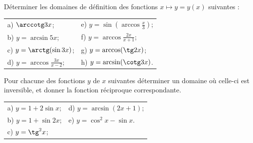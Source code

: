 \documentclass[12pt,french,oneside,a4paper]{memoir} %
\begin{document}
\begin{exo}
Déterminer les domaines de définition des fonctions
  $x\mapsto y=y(x)$ suivantes :
  
  \begin{tabular}{ll}
  a) $\displaystyle{\arccotg 3x}$;\qquad\qquad&
  e) $\displaystyle{y=\sin(\arccos\frac{x}{3})}$;\\[2mm]
  b) $\displaystyle{y=\arcsin 5x}$;\qquad\qquad&
  f) $\displaystyle{y=\arccos\frac{2x}{x+1}}$;\\[2mm]
  c) $\displaystyle{y=\arctg(\sin 3x)}$;\qquad\qquad&
  g) $\displaystyle{y=\arccos(\tg 2x)}$;\\[2mm]
  d) $\displaystyle{y=\arccos\frac{3x}{x-2}}$;\qquad\qquad&
  h) $\displaystyle{y=\arcsin(\cotg 3x)}$.
  \end{tabular}
\end{exo}
\begin{exo}
Pour chacune des fonctions $y$ de $x$ suivantes déterminer
  un domaine où celle-ci est inversible, et donner la fonction
  réciproque correspondante.
  
  \begin{tabular}{ll}
  a) $\displaystyle{y=1+2\sin x}$;\qquad\qquad&
  d) $\displaystyle{y=\arcsin(2x+1)}$;\\[2mm]
  b) $\displaystyle{y=1+\sin 2x}$;\qquad\qquad&
  e) $\displaystyle{y=\cos^2x-\sin x}$.\\[2mm]
  c) $\displaystyle{y=\tg^2x}$;&
  \end{tabular}
\end{exo}
\end{document}
